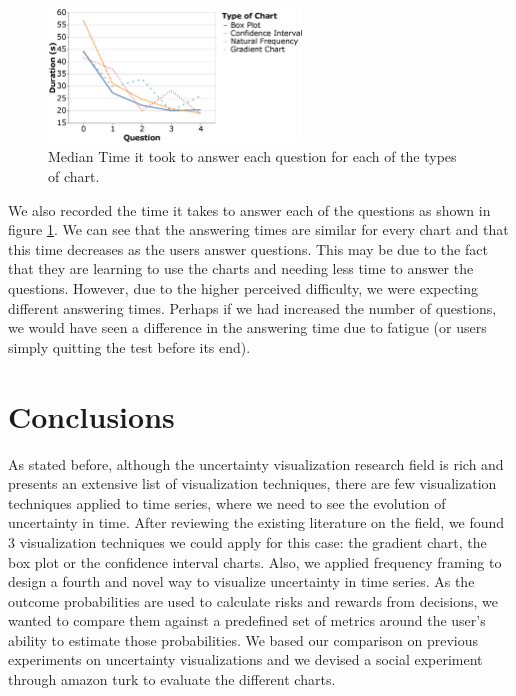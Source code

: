 \documentclass[a4paper,3p,sort&compress]{elsarticle}
\begin{document}
\begin{figure}
  \centering
   \includegraphics[width=0.6\textwidth]{duration_evo2}
  \caption{\label{figure:duration} Median Time it took to answer each question for each of the types of chart.}
\end{figure}  

We also recorded the time it takes to answer each of the questions as shown in figure \ref{figure:duration}. We 
can see that the answering times are similar for every chart and that this time decreases as the users answer questions.
This may be due to the fact that they are learning to use the charts and needing less time to answer the questions.
However, due to the higher perceived difficulty, we were expecting different answering times. Perhaps if we had 
increased the number of questions, we would have seen a difference in the answering time due to fatigue (or users simply quitting the test 
before its end).


\section{Conclusions}
\label{sec:concl}

As stated before, although the uncertainty visualization research field is rich and presents an extensive list of visualization techniques, 
there are few 
visualization techniques applied to time series, where we need to see the evolution of uncertainty 
in time. After reviewing the existing literature on the field, we found 3 visualization techniques we could apply for this case:
the gradient chart, the box plot or the confidence interval charts. Also, we applied frequency framing 
to design a fourth and novel way to visualize uncertainty in time series.
As the outcome probabilities are used to calculate risks and rewards from decisions, we wanted to compare them against a predefined set of 
metrics around the user's ability to estimate those probabilities.
We based our comparison on previous experiments on uncertainty visualizations and we devised a social experiment through amazon turk to 
evaluate the different charts.
\end{document}
